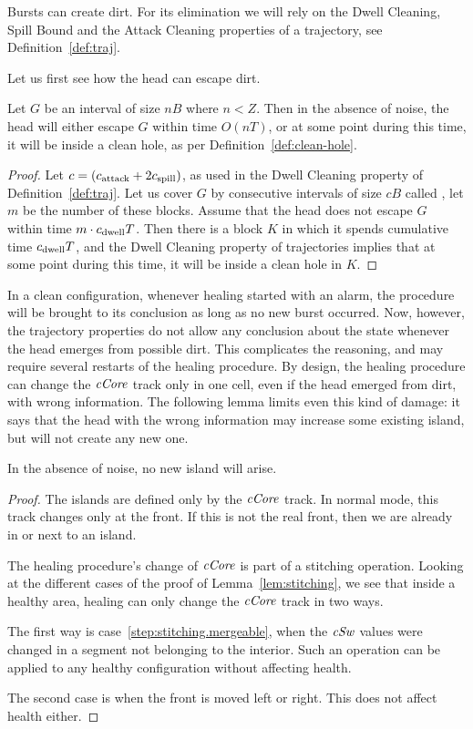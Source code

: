 \documentclass[12pt]{memoir}
\newcommand{\fld}[1]{\ensuremath{\textit{#1\/}}}
\def\B{B}
\newcommand{\Tu}{T}
\newcommand{\Z}{Z}
\newcommand{\cCore}{\fld{cCore}}
\newcommand{\CDwell}{\cns{dwell}}
\newcommand{\cSweep}{\fld{cSw}}
\newcommand{\cns}[1]{c_{\textrm{\upshape #1}}}
\newcommand{\CAtt}{\cns{attack}}
\newcommand{\CSpill}{\cns{spill}}
\begin{document}
Bursts can create dirt.
For its elimination we will rely on the Dwell Cleaning, Spill Bound and the Attack Cleaning
properties of a trajectory, see Definition~\ref{def:traj}.

Let us first see how the head can escape dirt.

\begin{lemma}
Let \( G \) be an interval of size \( n\B \) where \( n<\Z \).
Then in the absence of noise, the head will either escape \( G \) within time \( O(n\Tu) \),
or at some point during this time, it will be inside a clean hole, as per Definition~\ref{def:clean-hole}.
\end{lemma}
\begin{proof}
  Let \( c = (\CAtt+2\CSpill) \), as used in the Dwell Cleaning property of Definition~\ref{def:traj}.
Let us cover \( G \) by consecutive intervals of size \( c\B \) called , let \( m \) be the
number of these blocks.
Assume that the head does not escape \( G \) within time \( m\cdot\CDwell\Tu \).
Then there is a block \( K \) in which it spends cumulative time \( \CDwell\Tu \),
and the Dwell Cleaning property of trajectories implies that at some point during this time, it
will be inside a clean hole in \( K \).
\end{proof}
 
In a clean configuration, whenever healing started with an alarm, the procedure
will be brought to its conclusion as long as no new burst occurred.
Now, however, the trajectory properties do not allow any conclusion about the
state whenever the head emerges from possible dirt.
This complicates the reasoning, and may require several restarts of the healing procedure.
By design, the healing procedure can change the \( \cCore \) track only in one cell,
even if the head emerged from dirt, with wrong information.
The following lemma limits even this kind of damage:
it says that the head with the wrong information may increase some existing island, but will
not create any new one.

\begin{lemma}
In the absence of noise, no new island will arise.
\end{lemma}
\begin{proof}
The islands are defined only by the \( \cCore \) track.
In normal mode, this track changes only at the front.
If this is not the real front, then we are already in or next to an island.

The healing procedure's change of \( \cCore \) is part of a stitching operation.
Looking at the different cases of the proof of Lemma~\ref{lem:stitching}, we see that 
inside a healthy area, healing can only change the \( \cCore \) track in two ways.

The first way is case~\ref{step:stitching.mergeable}, when the \( \cSweep \) values were changed
in a segment not belonging to the interior.
Such an operation can be applied to any healthy configuration without affecting health.

The second case is when the front is moved left or right.
This does not affect health either.
\end{proof}
\end{document}
